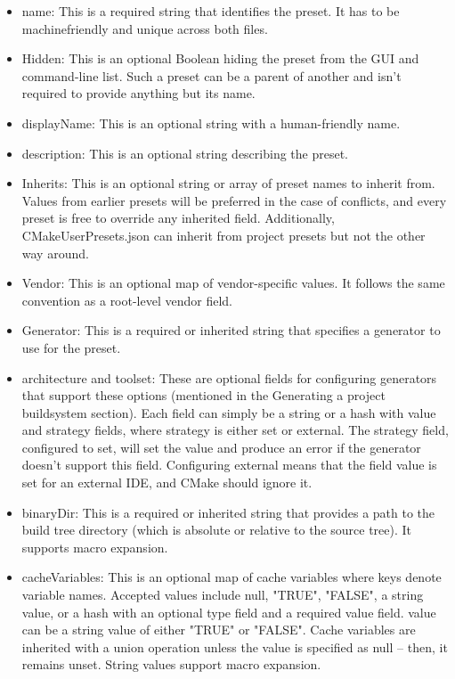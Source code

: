 \begin{itemize}
\item 
name: This is a required string that identifies the preset. It has to be machinefriendly and unique across both files.

\item 
Hidden: This is an optional Boolean hiding the preset from the GUI and command-line list. Such a preset can be a parent of another and isn't required to provide anything but its name.

\item 
displayName: This is an optional string with a human-friendly name.

\item 
description: This is an optional string describing the preset.

\item 
Inherits: This is an optional string or array of preset names to inherit from. Values from earlier presets will be preferred in the case of conflicts, and every preset is free to override any inherited field. Additionally, CMakeUserPresets.json can inherit from project presets but not the other way around.

\item 
Vendor: This is an optional map of vendor-specific values. It follows the same convention as a root-level vendor field.

\item 
Generator: This is a required or inherited string that specifies a generator to use for the preset.

\item 
architecture and toolset: These are optional fields for configuring generators that support these options (mentioned in the Generating a project buildsystem section). Each field can simply be a string or a hash with value and strategy fields, where strategy is either set or external. The strategy field, configured to set, will set the value and produce an error if the generator doesn't support this field. Configuring external means that the field value is set for an external IDE, and CMake should ignore it.

\item 
binaryDir: This is a required or inherited string that provides a path to the build tree directory (which is absolute or relative to the source tree). It supports macro expansion.

\item 
cacheVariables: This is an optional map of cache variables where keys denote variable names. Accepted values include null, "TRUE", "FALSE", a string value, or a hash with an optional type field and a required value field. value can be a string value of either "TRUE" or "FALSE". Cache variables are inherited with a union operation unless the value is specified as null – then, it remains unset. String values support macro expansion.


\end{itemize}

